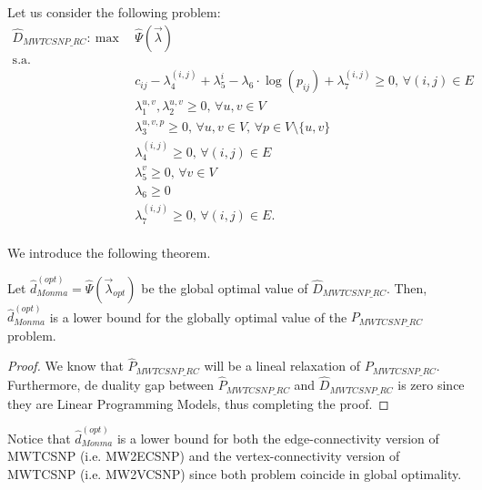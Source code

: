 \noindent Let us consider the following problem:\\

\begin{align}
 \hat{D}_{MWTCSNP\_RC}:~ \mathrm{max}~~ & \hat{\Psi}(\vec{\lambda})    \nonumber\\
 \mathrm{s.a.} & \nonumber\\
 &                  c_{ij}-\lambda^{(i,j)}_{4}+\lambda^{i}_{5}-\lambda_{6}\cdot \log(p_{ij})+\lambda^{(i,j)}_{7}\geq 0,\, \forall (i,j)\in E & \nonumber &\\
 &                  \lambda^{u,v}_{1},\lambda^{u,v}_{2}\geq 0,\, \forall u,v\in V & \nonumber &\\
 &                   \lambda^{u,v,p}_{3}\geq 0,\, \forall u,v\in V,\, \forall p\in V\setminus \{u,v\}  & \nonumber &\\
 &                   \lambda^{(i,j)}_{4}\geq 0,\, \forall (i,j)\in E  & \nonumber &\\
 &                   \lambda^{v}_{5}\geq 0,\, \forall v\in V  & \nonumber &\\
 &                   \lambda_{6}\geq 0  & \nonumber &\\
 &                   \lambda^{(i,j)}_{7}\geq 0,\, \forall (i,j)\in E.  & \nonumber &
\end{align}~\\


\noindent We introduce the following theorem.

\begin{theorem} Let $\hat{d}^{(opt)}_{Monma}=\hat{\Psi}(\vec{\lambda}_{opt})$ be the
global optimal value of $\hat{D}_{MWTCSNP\_RC}$. Then,
$\hat{d}^{(opt)}_{Monma}$ is a lower bound for the globally
optimal value of the $P_{MWTCSNP\_RC}$ problem.
\end{theorem}
\begin{proof} We know that $\hat{P}_{MWTCSNP\_RC}$ will be a lineal
relaxation of $P_{MWTCSNP\_RC}$. Furthermore, de duality gap
between $\hat{P}_{MWTCSNP\_RC}$ and $\hat{D}_{MWTCSNP\_RC}$ is
zero since they are Linear Programming Models, thus completing the
proof. \end{proof}


\noindent Notice that $\hat{d}^{(opt)}_{Monma}$ is a lower bound
for both the edge-connectivity version of MWTCSNP (i.e. MW2ECSNP)
and the vertex-connectivity version of MWTCSNP (i.e. MW2VCSNP)
since both problem coincide in global optimality.\\

\newpage
\newpage